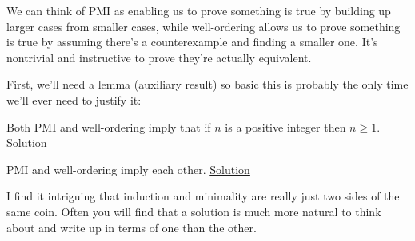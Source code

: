 We can think of PMI as enabling us to prove something is true by building up
larger cases from smaller cases, while well-ordering allows us to prove
something is true by assuming there's a counterexample and finding a smaller
one. It's nontrivial and instructive to prove they're actually
equivalent.

First, we'll need a lemma (auxiliary result) so basic this is probably the only
time we'll ever need to justify it:
\begin{result}\label{r:b:m:4:2}
  Both PMI and well-ordering imply that if $n$ is a positive integer then $n\ge
  1$.
  \hyperlink{s:m:4:2}{Solution}
\end{result}
\begin{result}\label{r:b:m:4:3}
  PMI and well-ordering imply each other.
  \hyperlink{s:m:4:3}{Solution}
\end{result}
I find it intriguing that induction and minimality are really just two sides of
the same coin. Often you will find that a solution is much more natural to think
about and write up in terms of one than the other.
